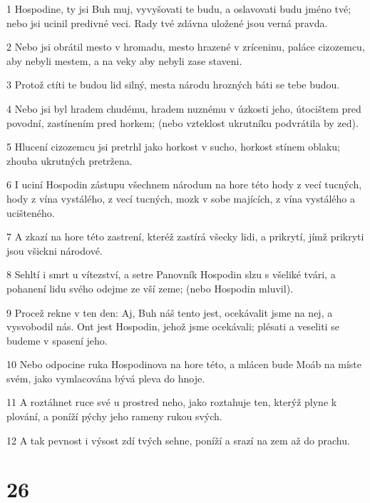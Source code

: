 \par 1 Hospodine, ty jsi Buh muj, vyvyšovati te budu, a oslavovati budu jméno tvé; nebo jsi ucinil predivné veci. Rady tvé zdávna uložené jsou verná pravda.
\par 2 Nebo jsi obrátil mesto v hromadu, mesto hrazené v zríceninu, paláce cizozemcu, aby nebyli mestem, a na veky aby nebyli zase staveni.
\par 3 Protož ctíti te budou lid silný, mesta národu hrozných báti se tebe budou.
\par 4 Nebo jsi byl hradem chudému, hradem nuznému v úzkosti jeho, útocištem pred povodní, zastínením pred horkem; (nebo vzteklost ukrutníku podvrátila by zed).
\par 5 Hlucení cizozemcu jsi pretrhl jako horkost v sucho, horkost stínem oblaku; zhouba ukrutných pretržena.
\par 6 I uciní Hospodin zástupu všechnem národum na hore této hody z vecí tucných, hody z vína vystálého, z vecí tucných, mozk v sobe majících, z vína vystálého a ucišteného.
\par 7 A zkazí na hore této zastrení, kteréž zastírá všecky lidi, a prikrytí, jímž prikryti jsou všickni národové.
\par 8 Sehltí i smrt u vítezství, a setre Panovník Hospodin slzu s všeliké tvári, a pohanení lidu svého odejme ze vší zeme; (nebo Hospodin mluvil).
\par 9 Procež rekne v ten den: Aj, Buh náš tento jest, ocekávalit jsme na nej, a vysvobodil nás. Ont jest Hospodin, jehož jsme ocekávali; plésati a veseliti se budeme v spasení jeho.
\par 10 Nebo odpocine ruka Hospodinova na hore této, a mlácen bude Moáb na míste svém, jako vymlacována bývá pleva do hnoje.
\par 11 A roztáhnet ruce své u prostred neho, jako roztahuje ten, kterýž plyne k plování, a poníží pýchy jeho rameny rukou svých.
\par 12 A tak pevnost i výsost zdí tvých sehne, poníží a srazí na zem až do prachu.

\chapter{26}

